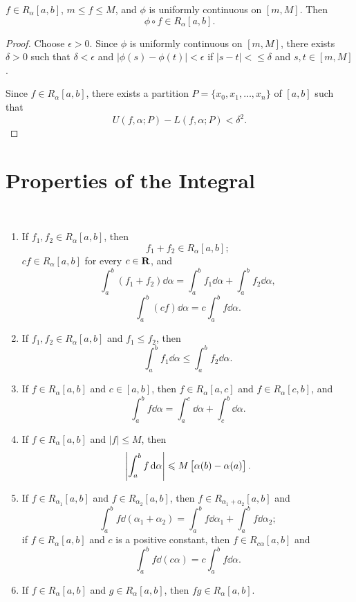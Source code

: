 \begin{proposition}
$f\in R_\alpha[a,b]$, $m\le f\le M$, and $\phi$ is uniformly continuous on $[m,M]$. Then
\[\phi\circ f\in R_\alpha[a,b].\]
\end{proposition}

\begin{proof}
Choose $\epsilon>0$. Since $\phi$ is uniformly continuous on $[m,M]$, there exists $\delta>0$ such that $\delta<\epsilon$ and $|\phi(s)-\phi(t)|<\epsilon$ if $|s-t|<\le\delta$ and $s,t\in[m,M]$.

Since $f\in R_\alpha[a,b]$, there exists a partition $P=\{x_0,x_1,\dots,x_n\}$ of $[a,b]$ such that
\[U(f,\alpha;P)-L(f,\alpha;P)<\delta^2.\]

\end{proof}

\section{Properties of the Integral}
\begin{theorem} \
\begin{enumerate}[label=(\roman*)]
\item If $f_1,f_2\in R_\alpha[a,b]$, then 
\[ f_1+f_2\in R_\alpha[a,b]; \]
$cf\in R_\alpha[a,b]$ for every $c\in\mathbf R$, and
\[ \int_a^b(f_1+f_2)\dd{\alpha}=\int_a^bf_1\dd{\alpha}+\int_a^bf_2\dd{\alpha}, \]
\[ \int_a^b(cf)\dd{\alpha}=c\int_a^bf\dd{\alpha}. \]

\item If $f_1,f_2\in R_\alpha[a,b]$ and $f_1\le f_2$, then
\[ \int_a^bf_1\dd{\alpha}\le\int_a^bf_2\dd{\alpha}. \]

\item If $f\in R_\alpha[a,b]$ and $c\in[a,b]$, then $f\in R_\alpha[a,c]$ and $f\in R_\alpha[c,b]$, and
\[ \int_a^bf\dd{\alpha}=\int_a^c\dd{\alpha}+\int_c^b\dd{\alpha}. \]

\item If $f\in R_\alpha[a,b]$ and $|f|\le M$, then
\[ \left|\int_a^bf\dd{\alpha}\right|\leqslant M\left[\alpha(b)-\alpha(a)\right]. \]

\item If $f\in R_{\alpha_1}[a,b]$ and $f\in R_{\alpha_2}[a,b]$, then $f\in R_{\alpha_1+\alpha_2}[a,b]$ and
\[ \int_a^bf\dd{(\alpha_1+\alpha_2)}=\int_a^bf\dd{\alpha_1}+\int_a^bf\dd{\alpha_2}; \]
if $f\in R_\alpha[a,b]$ and $c$ is a positive constant, then $f\in R_{c\alpha}[a,b]$ and
\[ \int_a^bf\dd{(c\alpha)}=c\int_a^bf\dd{\alpha}. \]

\item If $f\in R_\alpha[a,b]$ and $g\in R_\alpha[a,b]$, then $fg\in R_\alpha[a,b]$.
\end{enumerate}
\end{theorem}

